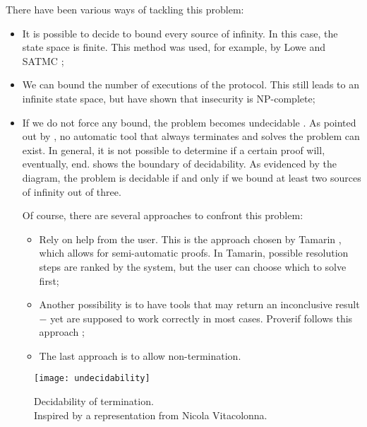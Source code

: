 There have been various ways of tackling this problem:
\begin{itemize}
    \item{It is possible to decide to bound every source of infinity. In this case, the state space is finite. This method was used, for example, by Lowe \cite{LoweNeedhamSchroederPK} and SATMC \cite{SATMC};}

    \item{We can bound the number of executions of the protocol. This still leads to an infinite state space, but \cite{SymbolicModelNPCompleteInsecurity} have shown that insecurity is NP-complete;}

    \item{If we do not force any bound, the problem becomes undecidable \cite{SymbolicModelUndecidability1} \cite{SymbolicModelUndecidability2}. As pointed out by \cite{SymbolicVerificationBlanchet}, no automatic tool that always terminates and solves the problem can exist. In general, it is not possible to determine if a certain proof will, eventually, end.  shows the boundary of decidability. As evidenced by the diagram, the problem is decidable if and only if we bound at least two sources of infinity out of three.

                Of course, there are several approaches to confront this problem:

                \begin{itemize}
                    \item{Rely on help from the user. This is the approach chosen by Tamarin \cite{TamarinFoundations}, which allows for semi-automatic proofs. In Tamarin, possible resolution steps are ranked by the system, but the user can choose which to solve first;}
                    \item{Another possibility is to have tools that may return an inconclusive result $-$ yet are supposed to work correctly in most cases. Proverif follows this approach \cite{SymbolicVerificationBlanchet};}
                    \item{The last approach is to allow non-termination.}
                \end{itemize}
          }
\end{itemize}


\begin{figure}[t]
    \texttt{[image: undecidability]}
    \centering
    \caption{Decidability of termination.\\Inspired by a representation from Nicola Vitacolonna.}
    \label{fig:undecidability}
\end{figure}